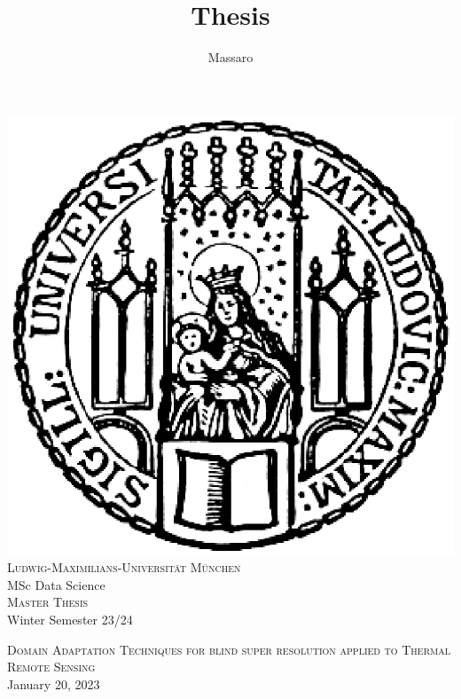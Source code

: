 \documentclass[11pt]{article}
\title{Thesis}
\author{Massaro}
\numberwithin{figure}{section}
\numberwithin{table}{section}
\begin{document}
\pagestyle{fancy}
\renewcommand{\sectionmark}[1]{\markboth{}{\thesection\ \ #1}}
\lhead{}
\chead{}
\rhead{\rightmark}
\lfoot{}
\cfoot{}
\rfoot{\thepage}

%
%
\begin{titlepage}

\thispagestyle{empty}

\begin{center}
\includegraphics[scale=0.5]{Includes/0-siegel.eps}\\
\large{\textsc{Ludwig-Maximilians-Universität München}}\\
\large{MSc Data Science }\\
{\textsc{Master Thesis}} \\ 
\vspace{0.5cm}
\small{Winter Semester 23/24 }
\end{center}

\vspace{2cm}


\begin{center}
\Large{\textsc{ Domain Adaptation Techniques for blind super resolution applied to Thermal Remote Sensing}} \\
January 20, 2023
\end{center}

\vspace{2cm}


\end{titlepage}
\end{document}
